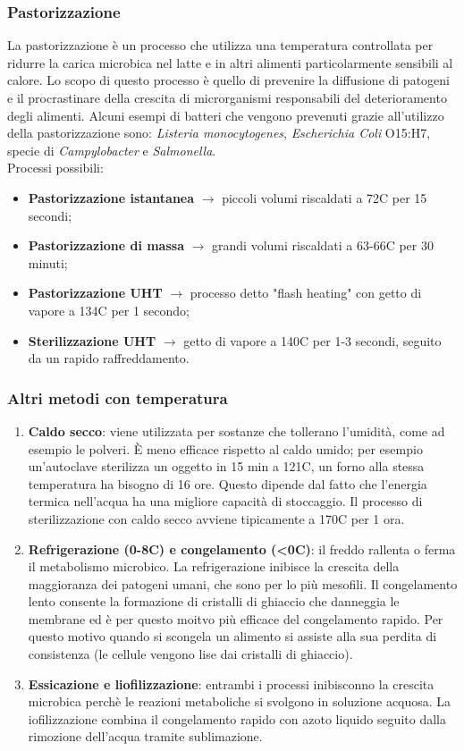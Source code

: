 \subsubsection{Pastorizzazione}
La pastorizzazione è un processo che utilizza una temperatura controllata per ridurre la carica microbica nel latte e in altri alimenti particolarmente sensibili al calore. Lo scopo di questo processo è quello di prevenire la diffusione di patogeni e il procrastinare della crescita di microrganismi responsabili del deterioramento degli alimenti. Alcuni esempi di batteri che vengono prevenuti grazie all'utilizzo della pastorizzazione sono: \textit{Listeria monocytogenes}, \textit{Escherichia Coli} O15:H7, specie di \textit{Campylobacter} e \textit{Salmonella}.
\\Processi possibili:
\begin{itemize}
    \item \textbf{Pastorizzazione istantanea} $\xrightarrow{}$ piccoli volumi riscaldati a 72C per 15 secondi;
    \item \textbf{Pastorizzazione di massa} $\xrightarrow{}$ grandi volumi riscaldati a 63-66C per 30 minuti;
    \item \textbf{Pastorizzazione UHT} $\xrightarrow{}$ processo detto "flash heating" con getto di vapore a 134C per 1 secondo;
    \item \textbf{Sterilizzazione UHT} $\xrightarrow{}$ getto di vapore a 140C per 1-3 secondi, seguito da un rapido raffreddamento. 
\end{itemize}
\subsubsection{Altri metodi con temperatura}
\begin{enumerate}
    \item \textbf{Caldo secco}: viene utilizzata per sostanze che tollerano l'umidità, come ad esempio le polveri. È meno efficace rispetto al caldo umido; per esempio un'autoclave sterilizza un oggetto in 15 min a 121C, un forno alla stessa temperatura ha bisogno di 16 ore. Questo dipende dal fatto che l'energia termica nell'acqua ha una migliore capacità di stoccaggio. Il processo di sterilizzazione con caldo secco avviene tipicamente a 170C per 1 ora.
    \item \textbf{Refrigerazione (0-8C) e congelamento (<0C)}: il freddo rallenta o ferma il metabolismo microbico. La refrigerazione inibisce la crescita della maggioranza dei patogeni umani, che sono per lo più mesofili. Il congelamento lento consente la formazione di cristalli di ghiaccio che danneggia le membrane ed è per questo moitvo più efficace del congelamento rapido. Per questo motivo quando si scongela un alimento si assiste alla sua perdita di consistenza (le cellule vengono lise dai cristalli di ghiaccio).
    \item \textbf{Essicazione e liofilizzazione}: entrambi i processi inibisconno la crescita microbica perchè le reazioni metaboliche si svolgono in soluzione acquosa. La iofilizzazione combina il congelamento rapido con azoto liquido seguito dalla rimozione dell'acqua tramite sublimazione.
\end{enumerate}
